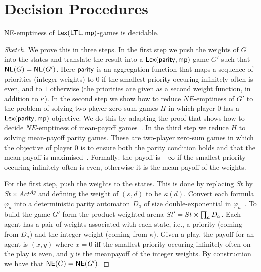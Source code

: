 \section{Decision Procedures} \label{sec:decision procedures}



\begin{theorem}
 NE-emptiness of ${\sf Lex}(\mathsf{LTL},{\sf mp})$-games is decidable. 
\end{theorem}

\begin{proof}[Sketch]
We prove this in three steps. In the first step we push the weights of $G$ into the states and translate the result into a ${\sf Lex}({\sf parity},{\sf mp})$ game $G'$ such that ${\sf NE}(G) = {\sf NE}(G')$. Here ${\sf parity}$ is an aggregation function that maps a sequence of priorities (integer weights) to $0$ if the smallest priority occuring infinitely often is even, and to $1$ otherwise (the priorities are given as a second weight function, in addition to $\kappa$). In the second step we show how to reduce $NE$-emptiness of $G'$ 
to the problem of solving two-player zero-sum games $H$ in which player $0$ has a ${\sf Lex}({\sf parity},{\sf mp})$ objective. We do this by adapting the proof that shows how to decide $NE$-emptiness of mean-payoff games~\cite{DBLP:conf/concur/UmmelsW11}.  In the third step we reduce $H$ to solving mean-payoff parity games. These are two-player zero-sum games in which the objective of player $0$ is to ensure both the parity condition holds and that the mean-payoff is maximised~\cite{DBLP:conf/lics/ChatterjeeHJ05}. Formally: the payoff is $-\infty$ if the smallest priority occuring infinitely often is even, otherwise it is the mean-payoff of the weights.


For the first step, push the weights to the states. This is done by replacing $St$ by $St \times Act^{Ag}$ and defining the weight of $(s,d)$ to be $\kappa(d)$. Convert each \LTL formula $\varphi_a$ into a deterministic parity automaton $D_a$ of size double-exponential in $\varphi_a$~\cite{??}. To build the game $G'$ form the product weighted arena $St' = St \times \prod_a D_a$. Each agent has a pair of weights associated with each state, i.e., a priority (coming from $D_a$) and the integer weight (coming from $\kappa$).  Given a play, the payoff for an agent is $(x,y)$ where $x = 0$ iff the smallest priority occuring infinitely often on the play is even, and $y$ is the meanpayoff of the integer weights. By construction we have that ${\sf NE}(G) = {\sf NE}(G')$.


\end{proof}

